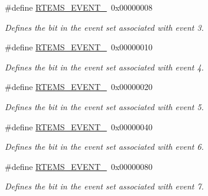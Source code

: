 \begin{DoxyCompactItemize}
\#define \mbox{\hyperlink{group__ClassicEventSet_ga59fb1c14abb8996e91c0cbf3276be503}{R\+T\+E\+M\+S\+\_\+\+E\+V\+E\+N\+T\+\_}}~0x00000008
\begin{DoxyCompactList}\small\item\em Defines the bit in the event set associated with event 3. \end{DoxyCompactList}\item 
\mbox{\label{group__ClassicEventSet_gaa8fcddcabf4b0acda9a5d80c43968b51}} 
\#define \mbox{\hyperlink{group__ClassicEventSet_gaa8fcddcabf4b0acda9a5d80c43968b51}{R\+T\+E\+M\+S\+\_\+\+E\+V\+E\+N\+T\+\_}}~0x00000010
\begin{DoxyCompactList}\small\item\em Defines the bit in the event set associated with event 4. \end{DoxyCompactList}\item 
\mbox{\label{group__ClassicEventSet_ga29127a672a9182286f89b12d2fe7b45c}} 
\#define \mbox{\hyperlink{group__ClassicEventSet_ga29127a672a9182286f89b12d2fe7b45c}{R\+T\+E\+M\+S\+\_\+\+E\+V\+E\+N\+T\+\_}}~0x00000020
\begin{DoxyCompactList}\small\item\em Defines the bit in the event set associated with event 5. \end{DoxyCompactList}\item 
\mbox{\label{group__ClassicEventSet_gaf059cf3f8c08c3953348fb4413652c08}} 
\#define \mbox{\hyperlink{group__ClassicEventSet_gaf059cf3f8c08c3953348fb4413652c08}{R\+T\+E\+M\+S\+\_\+\+E\+V\+E\+N\+T\+\_}}~0x00000040
\begin{DoxyCompactList}\small\item\em Defines the bit in the event set associated with event 6. \end{DoxyCompactList}\item 
\mbox{\label{group__ClassicEventSet_ga50edd933aaf552c2472ede87a1e84fae}} 
\#define \mbox{\hyperlink{group__ClassicEventSet_ga50edd933aaf552c2472ede87a1e84fae}{R\+T\+E\+M\+S\+\_\+\+E\+V\+E\+N\+T\+\_}}~0x00000080
\begin{DoxyCompactList}\small\item\em Defines the bit in the event set associated with event 7. \end{DoxyCompactList}\item 

\end{DoxyCompactItemize}
